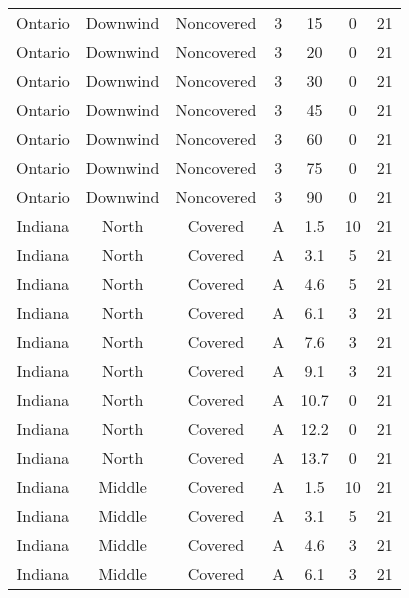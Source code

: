 \documentclass{article}
\begin{document}
\begin{longtable}[c]{ccccccc}
Ontario   & Downwind  & Noncovered & 3               & 15           & 0           & 21  \\
Ontario   & Downwind  & Noncovered & 3               & 20           & 0           & 21  \\
Ontario   & Downwind  & Noncovered & 3               & 30           & 0           & 21  \\
Ontario   & Downwind  & Noncovered & 3               & 45           & 0           & 21  \\
Ontario   & Downwind  & Noncovered & 3               & 60           & 0           & 21  \\
Ontario   & Downwind  & Noncovered & 3               & 75           & 0           & 21  \\
Ontario   & Downwind  & Noncovered & 3               & 90           & 0           & 21  \\
Indiana   & North     & Covered     & A               & 1.5          & 10          & 21  \\
Indiana   & North     & Covered     & A               & 3.1          & 5           & 21  \\
Indiana   & North     & Covered     & A               & 4.6          & 5           & 21  \\
Indiana   & North     & Covered     & A               & 6.1          & 3           & 21  \\
Indiana   & North     & Covered     & A               & 7.6          & 3           & 21  \\
Indiana   & North     & Covered     & A               & 9.1          & 3           & 21  \\
Indiana   & North     & Covered     & A               & 10.7         & 0           & 21  \\
Indiana   & North     & Covered     & A               & 12.2         & 0           & 21  \\
Indiana   & North     & Covered     & A               & 13.7         & 0           & 21  \\
Indiana   & Middle    & Covered     & A               & 1.5          & 10          & 21  \\
Indiana   & Middle    & Covered     & A               & 3.1          & 5           & 21  \\
Indiana   & Middle    & Covered     & A               & 4.6          & 3           & 21  \\
Indiana   & Middle    & Covered     & A               & 6.1          & 3           & 21  \\

\end{longtable}
\end{document}
